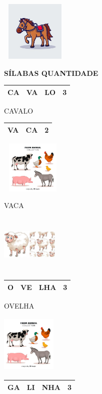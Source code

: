 \includegraphics[width=1.29126in,height=1.13542in]{media/image26.jpg}

\textbf{SÍLABAS QUANTIDADE}

\begin{longtable}[]{@{}llll@{}}
\toprule
CA & VA & LO & 3\tabularnewline
\bottomrule
\end{longtable}

CAVALO

\begin{longtable}[]{@{}lll@{}}
\toprule
VA & CA & 2\tabularnewline
\bottomrule
\end{longtable}

\includegraphics[width=1.19577in,height=0.98873in]{media/image27.jpg}

VACA

\includegraphics[width=1.06250in,height=1.09969in]{media/image28.jpg}

\begin{longtable}[]{@{}llll@{}}
\toprule
O & VE & LHA & 3\tabularnewline
\bottomrule
\end{longtable}

OVELHA

\includegraphics[width=1.03125in,height=1.09419in]{media/image27.jpg}

\begin{longtable}[]{@{}llll@{}}
\toprule
GA & LI & NHA & 3\tabularnewline
\bottomrule
\end{longtable}

